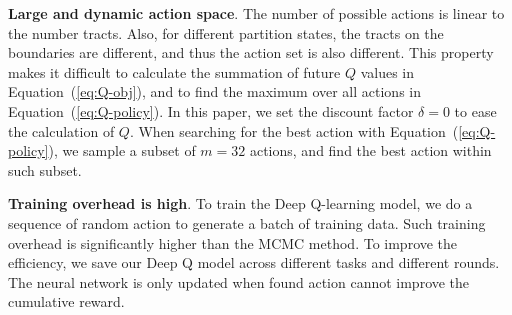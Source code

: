 \textbf{Large and dynamic action space}. The number of possible actions is linear to the number tracts. Also, for different partition states, the tracts on the boundaries are different, and thus the action set is also different. This property makes it difficult to calculate the summation of future $Q$ values in Equation~(\ref{eq:Q-obj}), and to find the maximum over all actions in Equation~(\ref{eq:Q-policy}). In this paper, we set the discount factor $\delta = 0$ to ease the calculation of $Q$. When searching for the best action with Equation~(\ref{eq:Q-policy}), we sample a subset of $m=32$ actions, and find the best action within such subset.

\textbf{Training overhead is high}. To train the Deep Q-learning model, we do a sequence of random action to generate a batch of training data. Such training overhead is significantly higher than the MCMC method. To improve the efficiency, we save our Deep Q model across different tasks and different rounds. The neural network is only updated when found action cannot improve the cumulative reward.